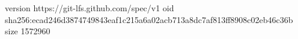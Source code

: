version https://git-lfs.github.com/spec/v1
oid sha256:ecad246d3874749843eaf1c215a6a02acb713a8dc7af813ff8908c02eb46c36b
size 1572960
